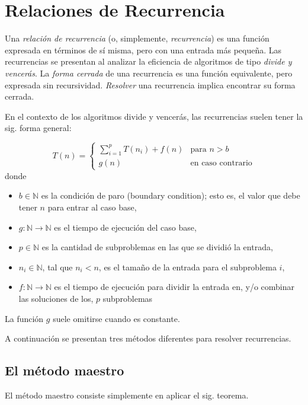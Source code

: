 \chapter{Relaciones de Recurrencia}

Una \emph{relación de recurrencia} (o, simplemente, \emph{recurrencia})
es una función expresada en términos de sí misma, pero con una entrada
más pequeña. Las recurrencias se presentan al analizar la
eficiencia de algoritmos de tipo \emph{divide y vencerás}. La \emph{forma
cerrada} de una recurrencia es una función equivalente, pero expresada
sin recursividad. \emph{Resolver} una recurrencia implica encontrar
su forma cerrada.

En el contexto de los algoritmos divide y vencerás, las recurrencias
suelen tener la sig. forma general: 

\[
    T(n)=\begin{cases}
        \sum_{i=1}^{p}T(n_{i})+f(n) & \text{para }n>b\\
        g(n) & \text{en caso contrario}
    \end{cases}
\]
donde

\begin{itemize}
    \item $b\in\mathbb{N}$ es la condición de paro (boundary condition); esto
    es, el valor que debe tener $n$ para entrar al caso base, 
    \item $g:\mathbb{N}\to\mathbb{N}$ es el tiempo de ejecución del caso base, 
    \item $p\in\mathbb{N}$ es la cantidad de subproblemas en las que se dividió
    la entrada, 
    \item $n_{i}\in\mathbb{N}$, tal que $n_{i}<n$, es el tamaño de la entrada
    para el subproblema $i$, 
    \item $f:\mathbb{N}\to\mathbb{N}$ es el tiempo de ejecución para dividir
    la entrada en, y/o combinar las soluciones de los, $p$ subproblemas 
\end{itemize}
La función $g$ suele omitirse cuando es constante. 

A continuación se presentan tres métodos diferentes para resolver
recurrencias.

\section{El método maestro}

El método maestro consiste simplemente en aplicar el sig. teorema.

